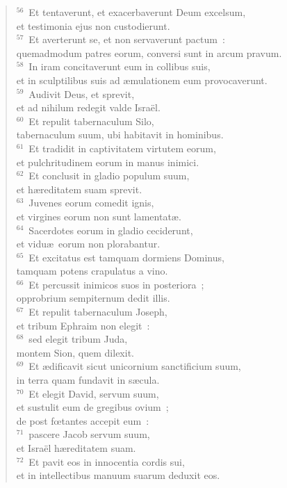 \begin{flushleft}
\begin{verse}
${}^{56}$~Et tentaverunt, et exacerbaverunt Deum excelsum,\\ et testimonia ejus non custodierunt.\\
${}^{57}$~Et averterunt se, et non servaverunt pactum~:\\ quemadmodum patres eorum, conversi sunt in arcum pravum.\\
${}^{58}$~In iram concitaverunt eum in collibus suis,\\ et in sculptilibus suis ad \ae mulationem eum provocaverunt.\\
${}^{59}$~Audivit Deus, et sprevit,\\ et ad nihilum redegit valde Isra\"el.\\
${}^{60}$~Et repulit tabernaculum Silo,\\ tabernaculum suum, ubi habitavit in hominibus.\\
${}^{61}$~Et tradidit in captivitatem virtutem eorum,\\ et pulchritudinem eorum in manus inimici.\\
${}^{62}$~Et conclusit in gladio populum suum,\\ et h\ae reditatem suam sprevit.\\
${}^{63}$~Juvenes eorum comedit ignis,\\ et virgines eorum non sunt lamentat\ae .\\
${}^{64}$~Sacerdotes eorum in gladio ceciderunt,\\ et vidu\ae\ eorum non plorabantur.\\
${}^{65}$~Et excitatus est tamquam dormiens Dominus,\\ tamquam potens crapulatus a vino.\\
${}^{66}$~Et percussit inimicos suos in posteriora~;\\ opprobrium sempiternum dedit illis.\\
${}^{67}$~Et repulit tabernaculum Joseph,\\ et tribum Ephraim non elegit~:\\
${}^{68}$~sed elegit tribum Juda,\\ montem Sion, quem dilexit.\\
${}^{69}$~Et \ae dificavit sicut unicornium sanctificium suum,\\ in terra quam fundavit in s\ae cula.\\
${}^{70}$~Et elegit David, servum suum,\\ et sustulit eum de gregibus ovium~;\\ de post fœtantes accepit eum~:\\
${}^{71}$~pascere Jacob servum suum,\\ et Isra\"el h\ae reditatem suam.\\
${}^{72}$~Et pavit eos in innocentia cordis sui,\\ et in intellectibus manuum suarum deduxit eos.\end{verse}\end{flushleft}



